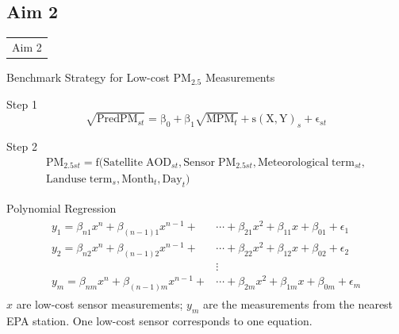 \documentclass[handout]{beamer} %
\begin{document}

\subsection*{Aim 2}

\begin{frame}{}
    \begin{table}
        \LARGE
        \centering
        \begin{tabular}{c}
             \textcolor[rgb]{0.1,0.1,0.6}{Aim 2}
        \end{tabular}
    \end{table}
\end{frame}

\begin{frame}{Benchmark Strategy for Low-cost PM$_{2.5}$ Measurements}
    \begin{block}{Step 1}
            \begin{equation*}
        \mathrm{\sqrt{PredPM_\mathit{st}}=\beta_0+\beta_1 \sqrt{MPM_\mathit{t}}+s(X,Y)_\mathit{s}+\epsilon_\mathit{st}}
    \end{equation*}
    \end{block}
    \begin{block}{Step 2}
        \begin{align*}
        \mathrm{PM_{2.5\mathit{st}}=f(Satellite\;AOD_{\mathit{st}},Sensor\;PM_{2.5\mathit{st}},Meteorological\;term_{\mathit{st}},}\\
        \mathrm{Landuse\;term_\mathit{s},Month_\mathit{t}, Day_\mathit{t})}
        \end{align*}
    \end{block}
\end{frame}

\begin{frame}{Polynomial Regression}
    \begin{align*}
        \begin{split}
        y_1=\beta_{n1}x^n+\beta_{(n-1)1}x^{n-1}+&\cdots+\beta_{21}x^2+\beta_{11}x+\beta_{01} + \epsilon_1 \\
        y_2=\beta_{n2}x^n+\beta_{(n-1)2}x^{n-1}+&\cdots+\beta_{22}x^2+\beta_{12}x+\beta_{02} + \epsilon_2 \\
        &\vdots \\
        y_m=\beta_{nm}x^n+\beta_{(n-1)m}x^{n-1}+&\cdots+\beta_{2m}x^2+\beta_{1m}x+\beta_{0m} + \epsilon_m
        \end{split}
    \end{align*}
    \textcolor[rgb]{0.1,0.1,0.6}{$x$ are low-cost sensor measurements; $y_m$ are the measurements from the nearest EPA station. One low-cost sensor corresponds to one equation.}
\end{frame}
\end{document}

